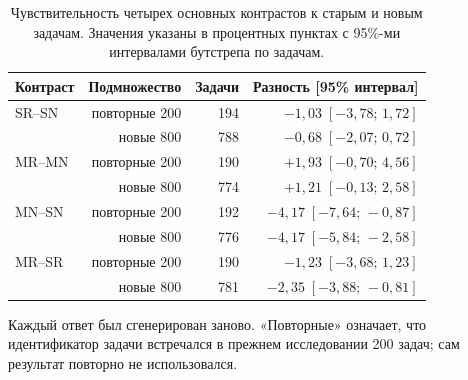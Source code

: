 \begin{table}[H]
\caption{Чувствительность четырех основных контрастов к старым и новым задачам. Значения указаны в процентных пунктах с 95\%-ми интервалами бутстрепа по задачам.}
\label{tab:subgroup-sensitivity}
\centering\small
\begin{tabular}{@{}lrrr@{}}
\toprule
Контраст & Подмножество & Задачи & Разность [95\% интервал]\\
\midrule
SR--SN & повторные 200 & 194 & $-1{,}03\;[-3{,}78;\,1{,}72]$\\
       & новые 800 & 788 & $-0{,}68\;[-2{,}07;\,0{,}72]$\\
MR--MN & повторные 200 & 190 & $+1{,}93\;[-0{,}70;\,4{,}56]$\\
       & новые 800 & 774 & $+1{,}21\;[-0{,}13;\,2{,}58]$\\
MN--SN & повторные 200 & 192 & $-4{,}17\;[-7{,}64;\,-0{,}87]$\\
       & новые 800 & 776 & $-4{,}17\;[-5{,}84;\,-2{,}58]$\\
MR--SR & повторные 200 & 190 & $-1{,}23\;[-3{,}68;\,1{,}23]$\\
       & новые 800 & 781 & $-2{,}35\;[-3{,}88;\,-0{,}81]$\\
\bottomrule
\end{tabular}
\par\smallskip\noindent Каждый ответ был сгенерирован заново. «Повторные» означает, что идентификатор задачи встречался в прежнем исследовании 200 задач; сам результат повторно не использовался.
\end{table}
